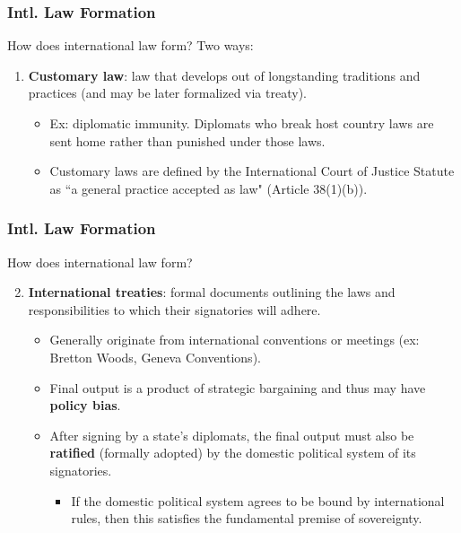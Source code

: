 \documentclass{beamer}
\begin{document}
\begin{frame} 
	\frametitle{\LARGE{Intl. Law Formation}}
How does international law form? Two ways:
	\begin{enumerate}
		\item \textbf{Customary law}: law that develops out of longstanding traditions and practices (and may be later formalized via treaty). \pause
		\begin{itemize}
			\item Ex: diplomatic immunity. Diplomats who break host country laws are sent home rather than punished under those laws. \pause
			\item Customary laws are defined by the International Court of Justice Statute as ``a general practice accepted as law" (Article 38(1)(b)).
			
			
		\end{itemize}	
	\end{enumerate}
\end{frame}

\begin{frame} 
	\frametitle{\LARGE{Intl. Law Formation}}
	How does international law form? 
	\begin{enumerate}
  	\setcounter{enumi}{1}
		\item \textbf{International treaties}: formal documents outlining the laws and responsibilities to which their signatories will adhere.
		\begin{itemize}
			\item Generally originate from international conventions or meetings (ex: Bretton Woods, Geneva Conventions). \pause
			\item Final output is a product of strategic bargaining and thus may have \textbf{policy bias}.
			\item After signing by a state's diplomats, the final output must also be \textbf{ratified} (formally adopted) by the domestic political system of its signatories. \pause
			\begin{itemize}
				\item If the domestic political system agrees to be bound by international rules, then this satisfies the fundamental premise of sovereignty.				 
			\end{itemize}
		\end{itemize}	
	\end{enumerate}
\end{frame}
\end{document}
